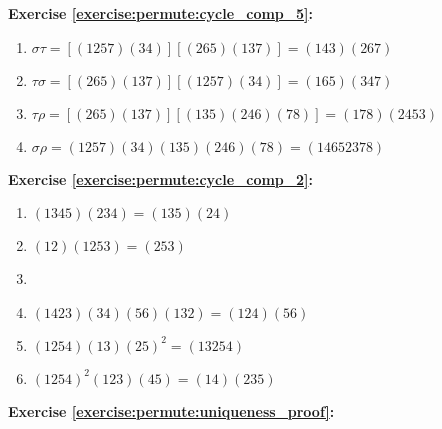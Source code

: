 \noindent\textbf{Exercise \ref{exercise:permute:cycle_comp_5}:}
%
%
\begin{enumerate}[{a.}]
\item
$\sigma\tau = [(1257)(34)][(265)(137)] = (143)(267)$

\item
$\tau \sigma = [(265)(137)][(1257)(34)] = (165)(347)$

\item
$\tau \rho = [(265)(137)][(135)(246)(78)] = (178)(2453)$

\item
$\sigma \rho = (1257)(34)(135)(246)(78) = (14652378)$
\end{enumerate}

\noindent\textbf{Exercise \ref{exercise:permute:cycle_comp_2}:} %
\begin{enumerate}[{a.}]
\item
$(1345)(234) = (135)(24)$

\item
$(12)(1253) = (253)$

\item

\item
$(1423)(34)(56)(132) = (124)(56)$

\item
$(1254)(13)(25)^2 = (13254)$ 

\item
$(1254)^2(123)(45) = (14)(235)$ 
\end{enumerate}

\noindent\textbf{Exercise \ref{exercise:permute:uniqueness_proof}:}\\

